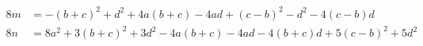 \begin{align*}
8m &= -(b+c)^2 + d^2 + 4a(b+c) - 4ad + (c-b)^2 - d^2 - 4(c-b)d \\
8n &= 8a^2 + 3(b+c)^2 + 3d^2 - 4a(b+c) - 4ad - 4(b+c)d + 5(c-b)^2 + 5d^2 \\
\end{align*}
